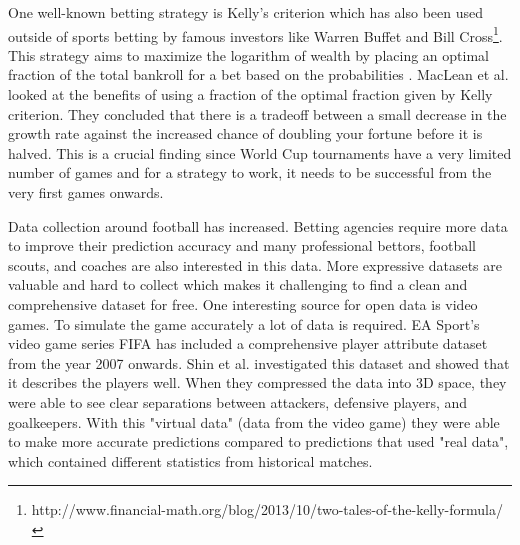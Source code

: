 One well-known betting strategy is Kelly's criterion which has also been used outside of sports betting by famous investors like Warren Buffet and Bill Cross\footnote{http://www.financial-math.org/blog/2013/10/two-tales-of-the-kelly-formula/}. This strategy aims to maximize the logarithm of wealth by placing an optimal fraction of the total bankroll for a bet based on the probabilities \cite{kelly2011new}. MacLean et al.\cite{maclean1992growth} looked at the benefits of using a fraction of the optimal fraction given by Kelly criterion. They concluded that there is a tradeoff between a small decrease in the growth rate against the increased chance of doubling your fortune before it is halved. This is a crucial finding since World Cup tournaments have a very limited number of games and for a strategy to work, it needs to be successful from the very first games onwards.

Data collection around football has increased. Betting agencies require more data to improve their prediction accuracy and many professional bettors, football scouts, and coaches are also interested in this data. More expressive datasets are valuable and hard to collect which makes it challenging to find a clean and comprehensive dataset for free. One interesting source for open data is video games. To simulate the game accurately a lot of data is required. EA Sport's video game series FIFA has included a comprehensive player attribute dataset from the year 2007 onwards. Shin et al.\cite{shin2014novel} investigated this dataset and showed that it describes the players well. When they compressed the data into 3D space, they were able to see clear separations between attackers, defensive players, and goalkeepers. With this "virtual data" (data from the video game) they were able to make more accurate predictions compared to predictions that used "real data", which contained different statistics from historical matches.
